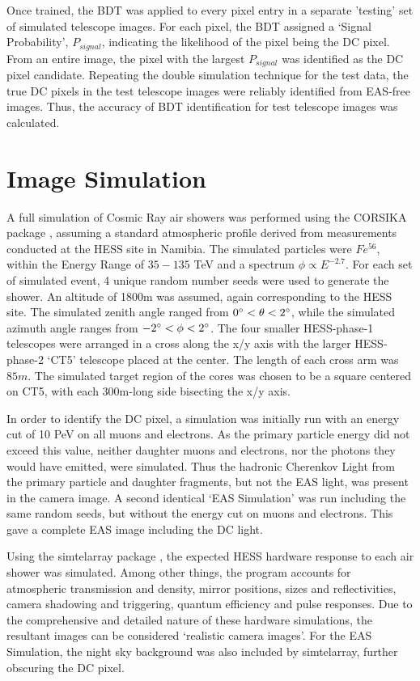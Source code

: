 \documentclass[]{article}
\begin{document}
Once trained, the BDT was applied to every pixel entry in a separate 'testing' set of simulated telescope images. For each pixel, the BDT assigned a \textquoteleft Signal Probability', $P_{signal}$, indicating the likelihood of the pixel being the DC pixel. From an entire image, the pixel with the largest $P_{signal}$ was identified as the DC pixel candidate. Repeating the double simulation technique for the test data, the true DC pixels in the test telescope images were reliably identified from EAS-free images. Thus, the accuracy of BDT identification for test telescope images was calculated.

\section{Image Simulation}
A full simulation of Cosmic Ray air showers was performed using the CORSIKA package \cite{Heck98}, assuming a standard atmospheric profile derived from measurements conducted at the HESS site in Namibia. The simulated particles were $Fe^{56}$, within the Energy Range of $35-135$ TeV and a spectrum $\phi \propto E^{-2.7}$. For each set of simulated event, 4 unique random number seeds were used to generate the shower. An altitude of 1800m was assumed, again corresponding to the HESS site. The simulated zenith angle ranged from $0\degree < \theta < 2 \degree$, while the simulated azimuth angle ranges from $-2\degree < \phi < 2 \degree$. The four smaller HESS-phase-1 telescopes were arranged in a cross along the x/y axis with the larger HESS-phase-2 \textquoteleft CT5' telescope placed at the center. The length of each cross arm was $85m$. The simulated target region of the cores was chosen to be a square centered on CT5, with each 300m-long side bisecting the x/y axis.

In order to identify the DC pixel, a simulation was initially run with an energy cut of 10 PeV on all muons and electrons. As the primary particle energy did not exceed this value, neither daughter muons and electrons, nor the photons they would have emitted, were simulated. Thus the hadronic Cherenkov Light from the primary particle and daughter fragments, but not the EAS light, was present in the camera image. A second identical \textquoteleft EAS Simulation' was run including the same random seeds, but without the energy cut on muons and electrons. This gave a complete EAS image including the DC light.

Using the sim\textunderscore telarray package \cite{Bernlohr08}, the expected HESS hardware response to each air shower was simulated. Among other things, the program accounts for atmospheric transmission and density, mirror positions, sizes and reflectivities, camera shadowing and triggering, quantum efficiency and pulse responses. Due to the comprehensive and detailed nature of these hardware simulations, the resultant images can be considered \textquoteleft realistic camera images'. For the EAS Simulation, the night sky background was also included by sim\textunderscore telarray, further obscuring the DC pixel.
\end{document}
